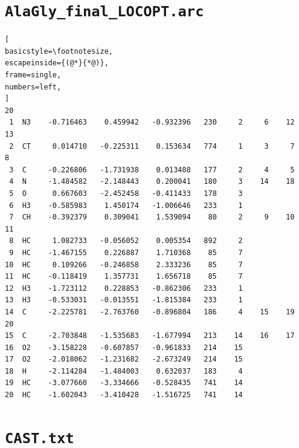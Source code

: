 \documentclass[a4paper,11pt]{scrartcl}
\begin{document}
\section{\texttt{AlaGly\_final\_LOCOPT.arc}}
\label{app:finalarc}
\begin{lstlisting}[
basicstyle=\footnotesize,
escapeinside={(@*}{*@)},
frame=single,
numbers=left,
]
20
 1  N3    -0.716463    0.459942   -0.932396   230     2     6    12    13
 2  CT     0.014710   -0.225311    0.153634   774     1     3     7     8
 3  C     -0.226806   -1.731938    0.013408   177     2     4     5
 4  N     -1.484582   -2.148443    0.200041   180     3    14    18
 5  O      0.667603   -2.452458   -0.411433   178     3
 6  H3    -0.585983    1.450174   -1.006646   233     1
 7  CH    -0.392379    0.309041    1.539094    80     2     9    10    11
 8  HC     1.082733   -0.056052    0.005354   892     2
 9  HC    -1.467155    0.226887    1.710368    85     7
10  HC     0.109266   -0.246858    2.333236    85     7
11  HC    -0.118419    1.357731    1.656718    85     7
12  H3    -1.723112    0.228853   -0.862306   233     1
13  H3    -0.533031   -0.013551   -1.815384   233     1
14  C     -2.225781   -2.763760   -0.896804   186     4    15    19    20
15  C     -2.703848   -1.535683   -1.677994   213    14    16    17
16  O2    -3.158228   -0.607857   -0.961833   214    15
17  O2    -2.018062   -1.231682   -2.673249   214    15
18  H     -2.114284   -1.484003    0.632037   183     4
19  HC    -3.077660   -3.334666   -0.528435   741    14
20  HC    -1.602043   -3.410428   -1.516725   741    14
\end{lstlisting}


\section{\texttt{CAST.txt}}
\label{app:casttxt}
\end{document}
